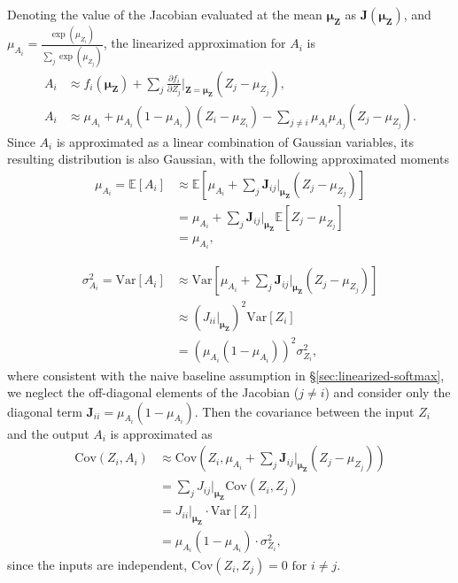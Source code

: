 \documentclass{uai2026} %
\begin{document}
Denoting the value of the Jacobian evaluated at the mean $\bm{\mu}_{\bm{Z}}$ as $\mathbf{J}(\bm{\mu}_{\bm{Z}})$, and $\mu_{A_i} = \frac{\exp(\mu_{Z_i})}{\sum_j \exp(\mu_{Z_j})}$, the linearized approximation for $A_i$ is
\begin{equation}
\label{eq:Ai_approx}
\begin{split}
A_i &\approx f_i(\bm{\mu}_{\bm{Z}}) + \sum_j \frac{\partial f_i}{\partial Z_j}\bigg|_{\bm{Z}=\bm{\mu}_{\bm{Z}}} (Z_j - \mu_{Z_j}), \\
A_i &\approx \mu_{A_i} + \mu_{A_i}(1-\mu_{A_i})(Z_i - \mu_{Z_i}) - \sum_{j \neq i} \mu_{A_i}\mu_{A_j}(Z_j - \mu_{Z_j}).
\end{split}
\end{equation}
Since $A_i$ is approximated as a linear combination of Gaussian variables, its resulting distribution is also Gaussian, with the following approximated moments
\begin{equation*}
\label{eq:mu_Ai}
\begin{split}
\mu_{A_i} = \mathbb{E}[A_i] &\approx \mathbb{E}\left[\mu_{A_i} + \sum_j \mathbf{J}_{ij}\big|_{\bm{\mu}_{\bm{Z}}} (Z_j - \mu_{Z_j})\right] \\
&= \mu_{A_i} + \sum_j \mathbf{J}_{ij}\big|_{\bm{\mu}_{\bm{Z}}} \mathbb{E}[Z_j - \mu_{Z_j}] \\
&= \mu_{A_i},
\end{split}
\end{equation*}

\begin{equation*}
\label{eq:sigma_Ai}
\begin{split}
\sigma_{A_i}^2 = \text{Var}[A_i] &\approx \text{Var}\left[\mu_{A_i} + \sum_j \mathbf{J}_{ij}\big|_{\bm{\mu}_{\bm{Z}}} (Z_j - \mu_{Z_j})\right] \\
&\approx \left(J_{ii}\big|_{\bm{\mu}_{\bm{Z}}}\right)^2 \text{Var}[Z_i] \\
&= (\mu_{A_i}(1-\mu_{A_i}))^2 \sigma_{Z_i}^2,
\end{split}
\end{equation*}
where consistent with the naive baseline assumption in \S\ref{sec:linearized-softmax}, we neglect the off-diagonal elements of the Jacobian ($j \neq i$) and consider only the diagonal term $\mathbf{J}_{ii} = \mu_{A_i}(1 - \mu_{A_i})$. Then the covariance between the input $Z_i$ and the output $A_i$ is approximated as
\begin{equation*}
\label{eq:cov_Zi_Ai}
\begin{split}
\text{Cov}(Z_i, A_i) &\approx \text{Cov}\left(Z_i, \mu_{A_i} + \sum_j \mathbf{J}_{ij}\big|_{\bm{\mu}_{\bm{Z}}} (Z_j - \mu_{Z_j})\right) \\
&= \sum_j J_{ij}\big|_{\bm{\mu}_{\bm{Z}}} \text{Cov}(Z_i, Z_j) \\
&= J_{ii}\big|_{\bm{\mu}_{\bm{Z}}} \cdot \text{Var}[Z_i] \\
&= \mu_{A_i}(1-\mu_{A_i}) \cdot \sigma_{Z_i}^2,
\end{split}
\end{equation*}
since the inputs are independent, $\text{Cov}(Z_i, Z_j)=0 \text{ for } i \neq j$.
\end{document}
